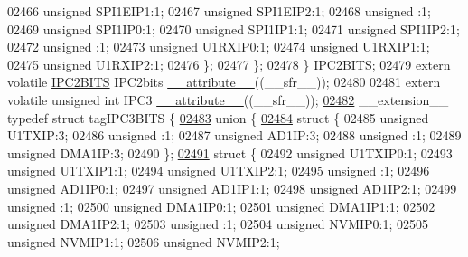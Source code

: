 \begin{DoxyCode}
02466       \textcolor{keywordtype}{unsigned} SPI1EIP1:1;
02467       \textcolor{keywordtype}{unsigned} SPI1EIP2:1;
02468       \textcolor{keywordtype}{unsigned} :1;
02469       \textcolor{keywordtype}{unsigned} SPI1IP0:1;
02470       \textcolor{keywordtype}{unsigned} SPI1IP1:1;
02471       \textcolor{keywordtype}{unsigned} SPI1IP2:1;
02472       \textcolor{keywordtype}{unsigned} :1;
02473       \textcolor{keywordtype}{unsigned} U1RXIP0:1;
02474       \textcolor{keywordtype}{unsigned} U1RXIP1:1;
02475       \textcolor{keywordtype}{unsigned} U1RXIP2:1;
02476     \};
02477   \};
02478 \} \hyperlink{a00008_dd/d5a/a00538}{IPC2BITS};
02479 \textcolor{keyword}{extern} \textcolor{keyword}{volatile} \hyperlink{a00008_dd/d5a/a00538}{IPC2BITS} IPC2bits \hyperlink{a00009_a493c46f03454991ccc5aa7a6e1dfb2a7}{\_\_attribute\_\_}((\_\_sfr\_\_));
02480 
02481 \textcolor{keyword}{extern} \textcolor{keyword}{volatile} \textcolor{keywordtype}{unsigned} \textcolor{keywordtype}{int}  IPC3 \hyperlink{a00009_a493c46f03454991ccc5aa7a6e1dfb2a7}{\_\_attribute\_\_}((\_\_sfr\_\_));
\hypertarget{a00009_source_l02482}{}\hyperlink{a00008}{02482} \_\_extension\_\_ \textcolor{keyword}{typedef} \textcolor{keyword}{struct }tagIPC3BITS \{
\hypertarget{a00009_source_l02483}{}\hyperlink{a00009}{02483}   \textcolor{keyword}{union }\{
\hypertarget{a00009_source_l02484}{}\hyperlink{a00009}{02484}     \textcolor{keyword}{struct }\{
02485       \textcolor{keywordtype}{unsigned} U1TXIP:3;
02486       \textcolor{keywordtype}{unsigned} :1;
02487       \textcolor{keywordtype}{unsigned} AD1IP:3;
02488       \textcolor{keywordtype}{unsigned} :1;
02489       \textcolor{keywordtype}{unsigned} DMA1IP:3;
02490     \};
\hypertarget{a00009_source_l02491}{}\hyperlink{a00009}{02491}     \textcolor{keyword}{struct }\{
02492       \textcolor{keywordtype}{unsigned} U1TXIP0:1;
02493       \textcolor{keywordtype}{unsigned} U1TXIP1:1;
02494       \textcolor{keywordtype}{unsigned} U1TXIP2:1;
02495       \textcolor{keywordtype}{unsigned} :1;
02496       \textcolor{keywordtype}{unsigned} AD1IP0:1;
02497       \textcolor{keywordtype}{unsigned} AD1IP1:1;
02498       \textcolor{keywordtype}{unsigned} AD1IP2:1;
02499       \textcolor{keywordtype}{unsigned} :1;
02500       \textcolor{keywordtype}{unsigned} DMA1IP0:1;
02501       \textcolor{keywordtype}{unsigned} DMA1IP1:1;
02502       \textcolor{keywordtype}{unsigned} DMA1IP2:1;
02503       \textcolor{keywordtype}{unsigned} :1;
02504       \textcolor{keywordtype}{unsigned} NVMIP0:1;
02505       \textcolor{keywordtype}{unsigned} NVMIP1:1;
02506       \textcolor{keywordtype}{unsigned} NVMIP2:1;

\end{DoxyCode}
